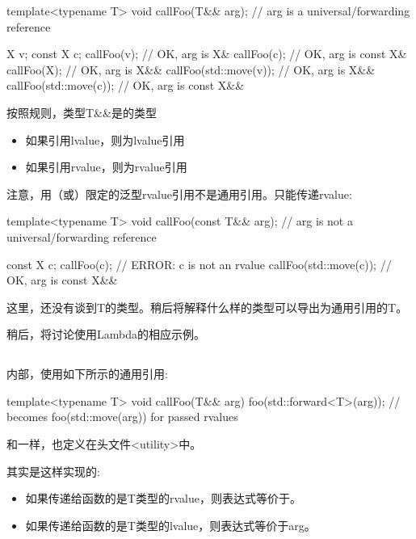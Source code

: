 \begin{cppcode}
template<typename T>
void callFoo(T&& arg); // arg is a universal/forwarding reference

X v;
const X c;
callFoo(v); // OK, arg is X&
callFoo(c); // OK, arg is const X&
callFoo(X{}); // OK, arg is X&&
callFoo(std::move(v)); // OK, arg is X&&
callFoo(std::move(c)); // OK, arg is const X&&
\end{cppcode}

按照规则，类型T\&\&是的类型

\begin{itemize}
	\item 如果引用lvalue，则为lvalue引用
	\item 如果引用rvalue，则为rvalue引用
\end{itemize}

注意，用（或）限定的泛型rvalue引用不是通用引用。只能传递rvalue:

\begin{cppcode}
template<typename T>
void callFoo(const T&& arg); // arg is not a universal/forwarding reference

const X c;
callFoo(c); // ERROR: c is not an rvalue
callFoo(std::move(c)); // OK, arg is const X&&
\end{cppcode}

这里，还没有谈到T的类型。稍后将解释什么样的类型可以导出为通用引用的T。

稍后，将讨论使用Lambda的相应示例。

\subsection{}

内部，使用如下所示的通用引用:

\begin{cppcode}
template<typename T>
void callFoo(T&& arg) {
	foo(std::forward<T>(arg)); // becomes foo(std::move(arg)) for passed rvalues
}
\end{cppcode}

和一样，也定义在头文件<utility>中。

其实是这样实现的:

\begin{itemize}
	\item 如果传递给函数的是T类型的rvalue，则表达式等价于。
	\item 如果传递给函数的是T类型的lvalue，则表达式等价于arg。
\end{itemize}

